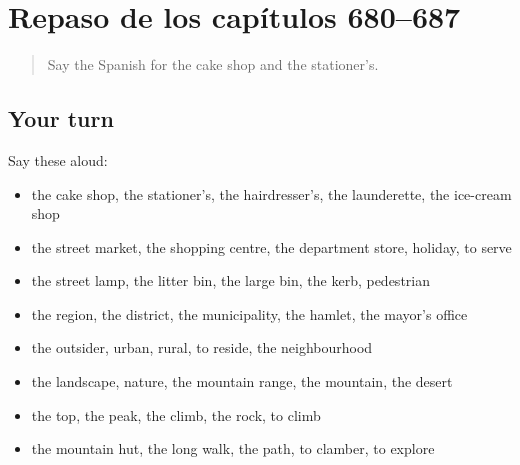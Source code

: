 \section[(dialogue)]{Repaso de los capítulos 680–687}

\label{lesson:ES-R687-repaso-680-687}



\begin{quote}
Say the Spanish for the cake shop and the stationer’s.
\end{quote}

\subsection*{Your turn}
Say these aloud:

\begin{itemize}
\raggedright
  \item the cake shop, the stationer’s, the hairdresser’s, the launderette, the ice-cream shop
  \item the street market, the shopping centre, the department store, holiday, to serve
  \item the street lamp, the litter bin, the large bin, the kerb, pedestrian
  \item the region, the district, the municipality, the hamlet, the mayor’s office
  \item the outsider, urban, rural, to reside, the neighbourhood
  \item the landscape, nature, the mountain range, the mountain, the desert
  \item the top, the peak, the climb, the rock, to climb
  \item the mountain hut, the long walk, the path, to clamber, to explore
\end{itemize}

